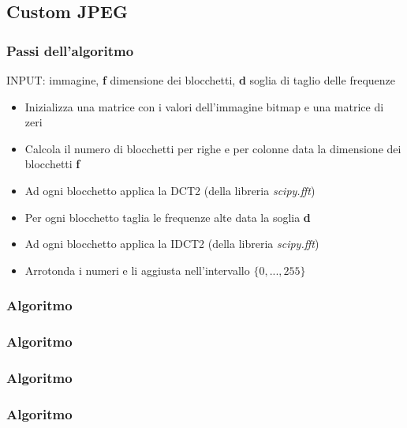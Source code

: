 \documentclass{beamer}
\begin{document}
\subsection{Custom JPEG}

\begin{frame}
\frametitle{Passi dell'algoritmo}
\begin{small}
INPUT: immagine, \textbf{f} dimensione dei blocchetti, \textbf{d} soglia di taglio delle frequenze
\begin{itemize}
\item Inizializza una matrice con i valori dell'immagine bitmap e una matrice di zeri
\item Calcola il numero di blocchetti per righe e per colonne data la dimensione dei blocchetti \textbf{f}
\item Ad ogni blocchetto applica la DCT2 (della libreria \textit{scipy.fft})
\item Per ogni blocchetto taglia le frequenze alte data la soglia \textbf{d}
\item Ad ogni blocchetto applica la IDCT2 (della libreria \textit{scipy.fft})
\item Arrotonda i numeri e li aggiusta nell'intervallo $\{0,...,255\}$
\end{itemize}
\end{small}
\end{frame}

\begin{frame}
\frametitle{Algoritmo}



\end{frame}

\begin{frame}
	\frametitle{Algoritmo}

\end{frame}

\begin{frame}
	\frametitle{Algoritmo}
	
\end{frame}

\begin{frame}
	\frametitle{Algoritmo}
	
\end{frame}
\end{document}
